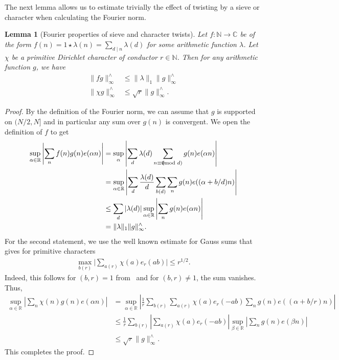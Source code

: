 \documentclass[12pt]{amsart}
\newtheorem{lemma}[theorem]{Lemma}
\theoremstyle{definition}
\theoremstyle{remark}
\numberwithin{equation}{section}
\newcommand{\1}{\mathbf{1}}
\newcommand{\R}{{\mathbb R}}
\let\oldpmod\pmod
\renewcommand{\pmod}[1]{\hspace{-0.12cm}\oldpmod {#1}}
\begin{document}
The next lemma allows us to estimate trivially the effect of twisting by a sieve or character when calculating the Fourier norm.
\begin{lemma}[Fourier properties of sieve and character twists]\label{lem_twistsievechar}
    Let $f\colon \mathbb{N}\to \mathbb{C}$ be of the form $f(n)=1\star \lambda (n)=\sum_{d\mid n}\lambda(d)$ for some arithmetic function $\lambda$. Let $\chi$ be a primitive Dirichlet character of conductor $r\in \mathbb{N}$. Then for any arithmetic function $g$, we have
	\begin{align*}
		\|fg\|_{\infty}^{\wedge} &\leq \|\lambda \|_1 \|g\|_{\infty}^{\wedge} \\
		\|\chi g\|_{\infty}^{\wedge} &\leq \sqrt{r} \|g\|_{\infty}^{\wedge}. 
	\end{align*}
\end{lemma}


\begin{proof}
By the definition of the Fourier norm, we can assume that $g$ is supported on $(N/2,N]$ and in particular any sum over $g(n)$ is convergent. 
We open the definition of $f$ to get
    \begin{align*}
        \sup_{\alpha\in \mathbb{R}} \left| \sum_{n} f(n)g(n)e(\alpha n)\right|&=\sup_{\alpha}\left|\sum_{d}\lambda(d) \sum_{n\equiv 0 \pmod d} g(n) e(\alpha n)\right|\\
        &=\sup_{\alpha\in \mathbb{R}} \left| \sum_{d}\frac{\lambda(d)}{d}\sum_{b(d)} \sum_{n} g(n) e((\alpha+b/d)n)\right|\\
        &\leq \sum_{d}|\lambda(d)|\sup_{\alpha\in \mathbb{R}} \left| \sum_{n} g(n) e(\alpha n)\right|\\
        &= \|\lambda \|_1 \|g\|_{\infty}^{\wedge}.
    \end{align*}
    For the second statement, we use the well known estimate for Gauss sums that gives for primitive characters 
    \begin{align*}
        \max_{b(r)}\bigl|\sum_{a(r)}\chi(a) e_r(ab)\bigr|\leq r^{1/2}.
    \end{align*}
    Indeed, this follows for $(b,r)=1$ from~\cite[Lemma 5.1]{mv} and for $(b,r)\neq 1$, the sum vanishes. Thus, 
     \begin{align*}
        \sup_{\alpha\in \mathbb{R}} \left| \sum_{n} \chi(n)g(n)e(\alpha n)\right|&=  \sup_{\alpha\in \mathbb{R}} \left| \frac{1}{r}\sum_{b(r)} \sum_{a(r)} \chi(a) e_r(-ab) \sum_{n} g(n)e((\alpha+b/r) n) \right|\\
        &\leq \frac{1}{r} \sum_{b(r)} \left|\sum_{a(r)}\chi(a)e_r(-ab) \right| \sup_{\beta \in \R} \left|  \sum_{n} g(n)e(\beta n) \right|\\
        &\leq \sqrt{r} \|g\|_{\infty}^{\wedge}.
    \end{align*}
    This completes the proof.
\end{proof}
	
\end{document}
